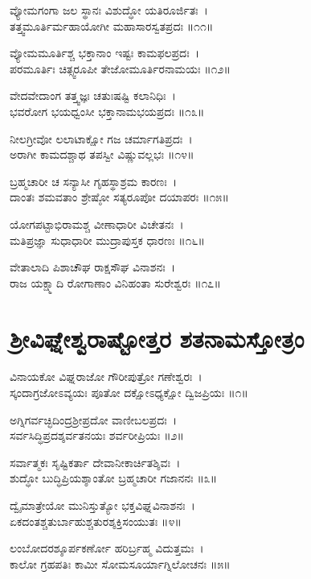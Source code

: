 ವ್ಯೋಮಗಂಗಾ ಜಲ ಸ್ಥಾನಃ ವಿಶುದ್ಧೋ ಯತಿರೂರ್ಜಿತಃ~।\\
ತತ್ತ್ವಮೂರ್ತಿರ್ಮಹಾಯೋಗೀ ಮಹಾಸಾರಸ್ವತಪ್ರದಃ ॥೧೧॥

ವ್ಯೋಮಮೂರ್ತಿಶ್ಚ ಭಕ್ತಾನಾಂ ಇಷ್ಟಃ ಕಾಮಫಲಪ್ರದಃ~।\\
ಪರಮೂರ್ತಿಃ ಚಿತ್ಸ್ವರೂಪೀ ತೇಜೋಮೂರ್ತಿರನಾಮಯಃ ॥೧೨॥

ವೇದವೇದಾಂಗ ತತ್ತ್ವಜ್ಞಃ ಚತುಃಷಷ್ಟಿ ಕಲಾನಿಧಿಃ~।\\
ಭವರೋಗ ಭಯಧ್ವಂಸೀ ಭಕ್ತಾನಾಮಭಯಪ್ರದಃ ॥೧೩॥

ನೀಲಗ್ರೀವೋ ಲಲಾಟಾಕ್ಷೋ ಗಜ ಚರ್ಮಾಗತಿಪ್ರದಃ~।\\
ಅರಾಗೀ ಕಾಮದಶ್ಚಾಥ ತಪಸ್ವೀ ವಿಷ್ಣುವಲ್ಲಭಃ ॥೧೪॥

ಬ್ರಹ್ಮಚಾರೀ ಚ ಸನ್ಯಾಸೀ ಗೃಹಸ್ಥಾಶ್ರಮ ಕಾರಣಃ~।\\
ದಾಂತಃ ಶಮವತಾಂ ಶ್ರೇಷ್ಠೋ ಸತ್ಯರೂಪೋ ದಯಾಪರಃ ॥೧೫॥

ಯೋಗಪಟ್ಟಾಭಿರಾಮಶ್ಚ ವೀಣಾಧಾರೀ ವಿಚೇತನಃ~।\\
ಮತಿಪ್ರಜ್ಞಾ ಸುಧಾಧಾರೀ ಮುದ್ರಾಪುಸ್ತಕ ಧಾರಣಃ ॥೧೬॥

ವೇತಾಲಾದಿ ಪಿಶಾಚೌಘ ರಾಕ್ಷಸೌಘ ವಿನಾಶನಃ~।\\
ರಾಜ ಯಕ್ಷ್ಮಾದಿ ರೋಗಾಣಾಂ ವಿನಿಹಂತಾ ಸುರೇಶ್ವರಃ ॥೧೭॥

\section{ಶ್ರೀವಿಘ್ನೇಶ್ವರಾಷ್ಟೋತ್ತರ ಶತನಾಮಸ್ತೋತ್ರಂ}

ವಿನಾಯಕೋ ವಿಘ್ನರಾಜೋ ಗೌರೀಪುತ್ರೋ ಗಣೇಶ್ವರಃ~।\\
ಸ್ಕಂದಾಗ್ರಜೋಽವ್ಯಯಃ ಪೂತೋ ದಕ್ಷೋಽಧ್ಯಕ್ಷೋ ದ್ವಿಜಪ್ರಿಯಃ ॥೧॥

ಅಗ್ನಿಗರ್ವಚ್ಛಿದಿಂದ್ರಶ್ರೀಪ್ರದೋ ವಾಣೀಬಲಪ್ರದಃ~।\\
ಸರ್ವಸಿದ್ಧಿಪ್ರದಶ್ಶರ್ವತನಯಃ ಶರ್ವರೀಪ್ರಿಯಃ ॥೨॥

ಸರ್ವಾತ್ಮಕಃ ಸೃಷ್ಟಿಕರ್ತಾ ದೇವಾನೀಕಾರ್ಚಿತಶ್ಶಿವಃ~।\\
ಶುದ್ಧೋ ಬುದ್ಧಿಪ್ರಿಯಶ್ಶಾಂತೋ ಬ್ರಹ್ಮಚಾರೀ ಗಜಾನನಃ ॥೩॥

ದ್ವೈಮಾತ್ರೇಯೋ ಮುನಿಸ್ತುತ್ಯೋ ಭಕ್ತವಿಘ್ನವಿನಾಶನಃ~।\\
ಏಕದಂತಶ್ಚತುರ್ಬಾಹುಶ್ಚತುರಶ್ಶಕ್ತಿಸಂಯುತಃ ॥೪॥

ಲಂಬೋದರಶ್ಶೂರ್ಪಕರ್ಣೋ ಹರಿರ್ಬ್ರಹ್ಮ ವಿದುತ್ತಮಃ~।\\
ಕಾಲೋ ಗ್ರಹಪತಿಃ ಕಾಮೀ ಸೋಮಸೂರ್ಯಾಗ್ನಿಲೋಚನಃ ॥೫॥

